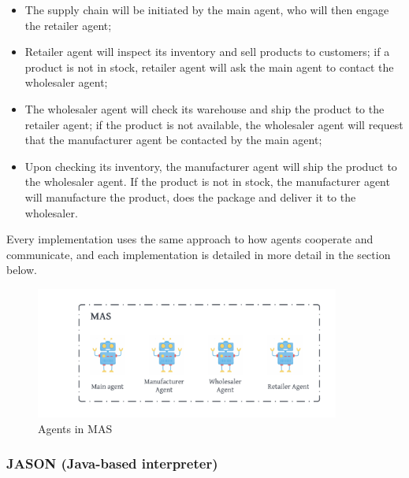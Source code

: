 \begin{itemize}
    \item The supply chain will be initiated by the main agent, who will then engage the retailer agent;
    
    \vspace{.5cm}
    
    \item Retailer agent will inspect its inventory and sell products to customers; if a product is not in stock, retailer agent will ask the main agent to contact the wholesaler agent;
    
    \vspace{.5cm}
    
    \item The wholesaler agent will check its warehouse and ship the product to the retailer agent; if the product is not available, the wholesaler agent will request that the manufacturer agent be contacted by the main agent;
    
    \vspace{.5cm}
    
    \item Upon checking its inventory, the manufacturer agent will ship the product to the wholesaler agent. If the product is not in stock, the manufacturer agent will manufacture the product, does the package and deliver it to the wholesaler.
    
    \vspace{.5cm}
    
\end{itemize}

Every implementation uses the same approach to how agents cooperate and communicate, and each implementation is detailed in more detail in the section below.

\begin{figure}[h]
\centering
  \includegraphics[width=10cm]{includes/figures/MAS.png} 
  \caption{Agents in \ac{MAS}}
  \label{Agents in MAS}
\end{figure}

\subsubsection{JASON (Java-based interpreter)}

